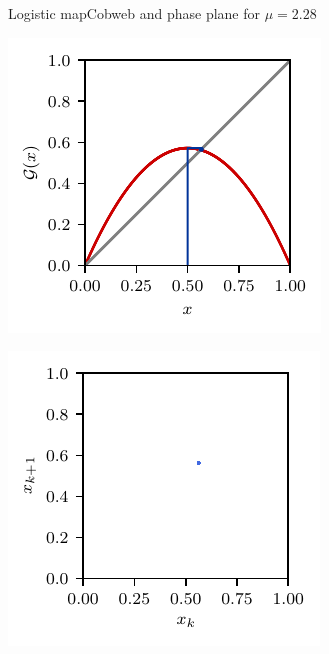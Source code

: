 \documentclass[usenames,dvipsnames,svgnames,10pt,aspectratio=169]{beamer}
\begin{document}
\begin{frame}[t, c]{Logistic map}{Cobweb and phase plane for $\mu = 2.28$}
	\begin{minipage}{.48\textwidth}
		\centering
		\includegraphics[width=.75\textwidth]{logistic_map_cobweb_plot_4}
	\end{minipage}%
	\begin{minipage}{.48\textwidth}
		\centering
		\includegraphics[width=.75\textwidth]{logistic_map_phase_plane_4}
	\end{minipage}

	\vspace{1cm}
\end{frame}
\end{document}
